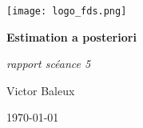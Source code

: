 \documentclass[12pt,a4paper]{report}
\begin{document}
\begin{titlepage}
  \centering
  \vspace*{0.5cm}
  \texttt{[image: logo\_fds.png]}\par
  \vspace{1.2cm}
  {\Huge \textbf{Estimation a posteriori}\par}
  \vspace{0.6cm}
  {\Large \textit{rapport scéance 5}\par}
  \vfill
  \begin{minipage}{0.48\textwidth}
    \raggedright Victor Baleux
  \end{minipage}
  \begin{minipage}{0.48\textwidth}
    \raggedleft \today
  \end{minipage}
\end{titlepage}

\tableofcontents
\end{document}
